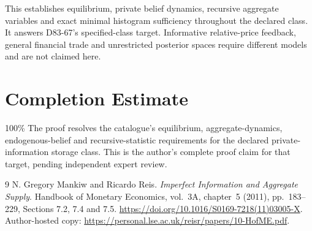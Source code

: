 \documentclass[11pt]{article}
\begin{document}
This establishes equilibrium, private belief dynamics, recursive aggregate variables and exact minimal histogram sufficiency throughout the declared class. It answers D83-67's specified-class target. Informative relative-price feedback, general financial trade and unrestricted posterior spaces require different models and are not claimed here.

\section*{Completion Estimate}
100\%
The proof resolves the catalogue's equilibrium, aggregate-dynamics,
endogenous-belief and recursive-statistic requirements for the declared
private-information storage class. This is the author's complete proof
claim for that target, pending independent expert review.

\begin{thebibliography}{9}
 N. Gregory Mankiw and Ricardo Reis.
\emph{Imperfect Information and Aggregate Supply}.
Handbook of Monetary Economics, vol.~3A, chapter~5 (2011), pp.~183--229,
Sections 7.2, 7.4 and 7.5.
\url{https://doi.org/10.1016/S0169-7218(11)03005-X}.
Author-hosted copy: \url{https://personal.lse.ac.uk/reisr/papers/10-HofME.pdf}.
\end{thebibliography}
\end{document}

